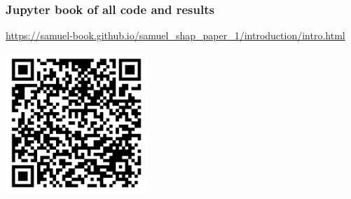 \begin{frame}
\frametitle{Jupyter book of all code and results}

\scriptsize
\url{https://samuel-book.github.io/samuel_shap_paper_1/introduction/intro.html}

\vspace{3mm}



\begin{center}
\includegraphics[width=0.4\textwidth]{./images/qr_shap_1_jupyter_book}
\end{center}


\end{frame}